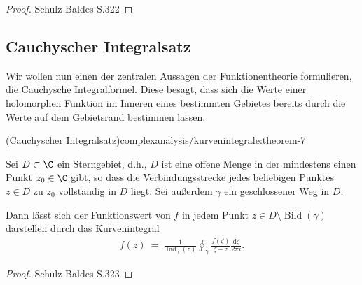 \documentclass[letterpaper,10pt,german]{jupyterBook}
\begin{document}
\begin{proof}
 Schulz Baldes S.322
\end{proof}


\subsection{Cauchyscher Integralsatz}
\label{\detokenize{complexanalysis/kurvenintegrale:cauchyscher-integralsatz}}
\par
Wir wollen nun einen der zentralen Aussagen der Funktionentheorie formulieren, die Cauchysche Integralformel.
Diese besagt, dass sich die Werte einer holomorphen Funktion im Inneren eines bestimmten Gebietes bereits durch die Werte auf dem Gebietsrand bestimmen lassen.
\begin{theorem}{(Cauchyscher Integralsatz)}{complexanalysis/kurvenintegrale:theorem-7}



\par
Sei \(D \subset \C\) ein Sterngebiet, d.h., \(D\) ist eine offene Menge in der mindestens einen Punkt \(z_0 \in \C\) gibt, so dass die Verbindungsstrecke jedes beliebigen Punktes \(z \in D\) zu \(z_0\) vollständig in \(D\) liegt.
Sei außerdem \(\gamma\) ein geschlossener Weg in \(D\).

\par
Dann lässt sich der Funktionswert von \(f\) in jedem Punkt \(z \in D \setminus \operatorname{Bild}(\gamma)\) darstellen durch das Kurvenintegral
\begin{align*}
f(z) \ = \ \frac{1}{\operatorname{Ind}_\gamma(z)} \oint_\gamma \frac{f(\zeta)}{\zeta - z} \frac{\mathrm{d}\zeta}{2\pi i}.
\end{align*}\end{theorem}

\begin{proof}
 Schulz Baldes S.323
\end{proof}
\end{document}
